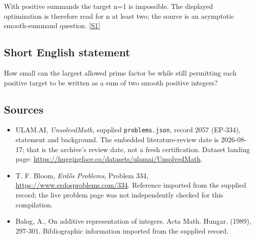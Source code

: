 \documentclass[11pt,a4paper]{article}
\newcommand{\sref}[2]{\hyperlink{source:#1:#2}{[S#2]}}
\begin{document}
With positive summands the target n=1 is impossible. The displayed optimization is therefore read for n at least two; the source is an asymptotic smooth-summand question. \sref{2057}{1}

\subsection{Short English statement}

How small can the largest allowed prime factor be while still permitting each positive target to be written as a sum of two smooth positive integers?

\subsection{Sources}

{\small

\begin{itemize}

\item[\hypertarget{source:2057:1}{S1}] ULAM.AI, \emph{UnsolvedMath}, supplied \texttt{problems.json}, record 2057 (EP-334), statement and background. The embedded literature-review date is 2026-08-17; that is the archive’s review date, not a fresh certification. Dataset landing page: \url{https://huggingface.co/datasets/ulamai/UnsolvedMath}.

\item[\hypertarget{source:2057:2}{S2}] T. F. Bloom, \emph{Erdős Problems}, Problem 334, \url{https://www.erdosproblems.com/334}. Reference imported from the supplied record; the live problem page was not independently checked for this compilation.

\item[\hypertarget{source:2057:3}{S3}] Balog, A., On additive representation of integers. Acta Math. Hungar. (1989), 297-301. Bibliographic information imported from the supplied record.

\end{itemize}

}

\label{end:2057}
\end{document}
